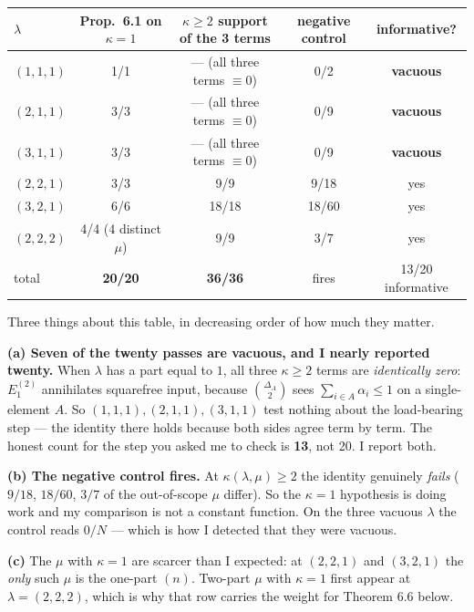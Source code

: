 \documentclass[11pt]{article}
\begin{document}
\begin{center}
\begin{tabular}{lcccc}
\toprule
$\lambda$ & Prop.\ 6.1 on $\kappa=1$ & $\kappa\ge2$ support of the 3 terms
          & negative control & informative? \\
\midrule
$(1,1,1)$ & 1/1   & --- (all three terms $\equiv0$) & 0/2  & \textbf{vacuous} \\
$(2,1,1)$ & 3/3   & --- (all three terms $\equiv0$) & 0/9  & \textbf{vacuous} \\
$(3,1,1)$ & 3/3   & --- (all three terms $\equiv0$) & 0/9  & \textbf{vacuous} \\
$(2,2,1)$ & 3/3   & 9/9   & 9/18  & yes \\
$(3,2,1)$ & 6/6   & 18/18 & 18/60 & yes \\
$(2,2,2)$ & 4/4 (4 distinct $\mu$) & 9/9 & 3/7 & yes \\
\midrule
total     & \textbf{20/20} & \textbf{36/36} & fires & 13/20 informative \\
\bottomrule
\end{tabular}
\end{center}

Three things about this table, in decreasing order of how much they matter.

\textbf{(a) Seven of the twenty passes are vacuous, and I nearly reported twenty.}
When $\lambda$ has a part equal to $1$, all three $\kappa\ge2$ terms are \emph{identically zero}:
$E_1^{(2)}$ annihilates squarefree input, because $\binom{\Delta_A}{2}$ sees
$\sum_{i\in A}\alpha_i\le1$ on a single-element $A$. So $(1,1,1),(2,1,1),(3,1,1)$ test nothing
about the load-bearing step --- the identity there holds because both sides agree term by term.
The honest count for the step you asked me to check is \textbf{13}, not 20. I report both.

\textbf{(b) The negative control fires.} At $\kappa(\lambda,\mu)\ge2$ the identity genuinely
\emph{fails} ($9/18$, $18/60$, $3/7$ of the out-of-scope $\mu$ differ). So the $\kappa=1$
hypothesis is doing work and my comparison is not a constant function. On the three vacuous
$\lambda$ the control reads $0/N$ --- which is how I detected that they were vacuous.

\textbf{(c)} The $\mu$ with $\kappa=1$ are scarcer than I expected: at $(2,2,1)$ and $(3,2,1)$
the \emph{only} such $\mu$ is the one-part $(n)$. Two-part $\mu$ with $\kappa=1$ first appear at
$\lambda=(2,2,2)$, which is why that row carries the weight for Theorem 6.6 below.
\end{document}
